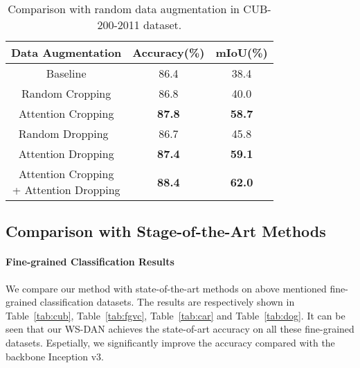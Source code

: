 \documentclass[10pt,twocolumn,letterpaper]{article}
\begin{document}
\begin{table}[h]
    \begin{center}
        \scriptsize
        \begin{tabular}{c|c|c}
            \hline
            Data Augmentation & Accuracy(\%) & mIoU(\%)\\
            \hline
            Baseline & 86.4 & 38.4 \\
            \hline
            Random Cropping & 86.8 & 40.0 \\
            Attention Cropping & \textbf{87.8} & \textbf{58.7} \\
            \hline
            Random Dropping~\cite{cutout} & 86.7 & 45.8 \\
            Attention Dropping & \textbf{87.4} & \textbf{59.1}\\
            \hline
            \makecell{Attention Cropping\\ + Attention Dropping} & \textbf{88.4} & \textbf{62.0}\\
            \hline
        \end{tabular}
    \end{center}
    \caption {Comparison with random data augmentation in CUB-200-2011 dataset.}
    \label{tab:random_augmentation}
\end{table}


\subsection{Comparison with Stage-of-the-Art Methods}
\paragraph{Fine-grained Classification Results}
We compare our method with state-of-the-art methods on above mentioned fine-grained classification datasets. The results are respectively shown in Table~\ref{tab:cub}, Table~\ref{tab:fgvc}, Table~\ref{tab:car} and Table~\ref{tab:dog}. It can be seen that our WS-DAN achieves the state-of-art accuracy on all these fine-grained datasets. Espetially, we significantly improve the accuracy compared with the backbone Inception v3.
\end{document}
